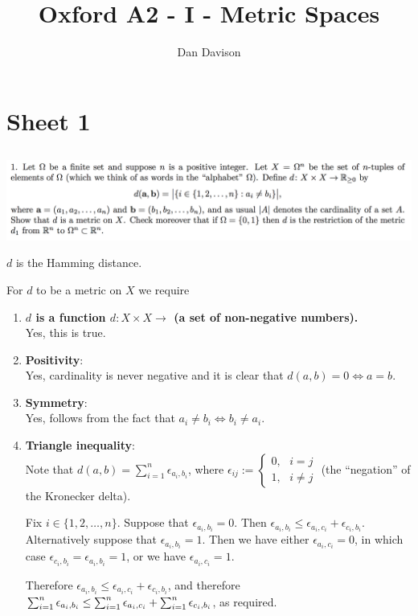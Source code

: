 \documentclass[12pt]{article}
\title{Oxford A2 - I - Metric Spaces
  \footnotetext{\url{https://courses.maths.ox.ac.uk/node/5378}}} \author{Dan Davison}
\author{}
\date{}
\begin{document}
\maketitle
\tableofcontents

\section{Sheet 1}

\subsection{}
\begin{mdframed}
\includegraphics[width=400pt]{img/oxford-a2-1-1.png}
\end{mdframed}

\begin{remark*}
  $d$ is the Hamming distance.
\end{remark*}

For $d$ to be a metric on $X$ we require
\begin{enumerate}
\item \textbf{$d$ is a function $d:X \times X \to $ (a set of non-negative numbers).}\\
  Yes, this is true.
\item \textbf{Positivity}:\\
  Yes, cardinality is never negative and it is clear that $d(a,b) = 0 \iff a = b$.
\item \textbf{Symmetry}:\\
  Yes, follows from the fact that $a_i \neq b_i \iff b_i \neq a_i$.
\item \textbf{Triangle inequality}:\\
  Note that $d(a, b) = \sum_{i=1}^n \epsilon_{a_i,b_i}$, where $\epsilon_{ij} :=
  \begin{cases}
    0, ~~~ i = j\\
    1, ~~~ i \neq j
  \end{cases}
$ (the ``negation'' of the Kronecker delta).

  Fix $i \in \{1, 2, \ldots, n\}$. Suppose that $\epsilon_{a_i,b_i} = 0$. Then
  $\epsilon_{a_i,b_i} \leq \epsilon_{a_i,c_i} + \epsilon_{c_i,b_i}$. Alternatively suppose that
  $\epsilon_{a_i,b_i} = 1$. Then we have either $\epsilon_{a_i,c_i} = 0$, in which case
  $\epsilon_{c_i,b_i} = \epsilon_{a_i,b_i} = 1$, or we have $\epsilon_{a_i,c_i} = 1$.

  Therefore $\epsilon_{a_i,b_i} \leq \epsilon_{a_i,c_i} + \epsilon_{c_i,b_i}$, and therefore
  $\sum_{i=1}^{n} \epsilon_{a_i,b_i} \leq \sum_{i=1}^{n} \epsilon_{a_i,c_i} + \sum_{i=1}^{n} \epsilon_{c_i,b_i}$, as required.
\end{enumerate}
\end{document}
